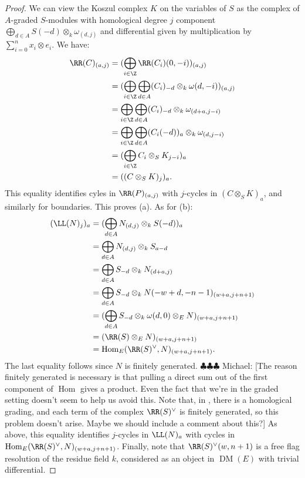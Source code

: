 \documentclass[12pt]{amsart}
\theoremstyle{definition}
\theoremstyle{remark}
\newcommand{\Hom}{\operatorname{Hom}} %
\newcommand{\michael}[1]{{\color{red} \sf $\clubsuit\clubsuit\clubsuit$ Michael: [#1]}}
\def\DM{\operatorname{DM}}
\def\o{\omega}
\begin{document}
\begin{proof}
We can view the Koszul complex $K$ on the variables of $S$ as the complex of $A$-graded $S$-modules with homological degree $j$ component $\bigoplus_{d \in A} S(-d) \otimes_k \o_{(d, j)}$ and differential  given by multiplication by $\sum_{i = 0}^n x_i \otimes e_i$. We have:
\begin{align*}
\RR(C)_{(a, j)} &= (\bigoplus_{ i \in \Z} \RR(C_i)(0,-i))_{(a, j)} \\
& = (\bigoplus_{i \in \Z} \bigoplus_{d \in A} (C_i)_{-d} \otimes_k \o(d, -i))_{(a, j)} \\ 
& = \bigoplus_{i \in \Z} \bigoplus_{d \in A} (C_i)_{-d} \otimes_k \o_{(d+a, j - i)} \\
& = \bigoplus_{i \in \Z} \bigoplus_{d \in A} (C_i(-d))_a \otimes_k \o_{(d, j - i)}  \\
& = (\bigoplus_{ i \in \Z} C_i \otimes_S K_{j - i})_a \\
& = ((C \otimes_S K)_{j})_a.
\end{align*}
This equality identifies cyles in $\RR(P)_{(a, j)}$ with $j$-cycles in $(C \otimes_S K)_a$, and similarly for boundaries. This proves (a). As for (b): 
\begin{align*}
(\LL(N)_j)_a &= (\bigoplus_{d \in A} N_{(d, j)} \otimes_k S(-d))_a\\
& = \bigoplus_{d \in A} N_{(d, j)} \otimes_k S_{a-d} \\
& = \bigoplus_{d \in A} S_{-d} \otimes_k N_{(d + a, j)} \\
& =  \bigoplus_{d \in A} S_{-d} \otimes_k N(-w + d , -n -1)_{(w + a, j + n + 1)} \\
& =  (\bigoplus_{d \in A} S_{-d} \otimes_k \o(d, 0) \otimes_E N)_{(w + a, j + n + 1)} \\
&= (\RR(S) \otimes_E N)_{(w + a, j + n + 1)} \\
&= \Hom_E(\RR(S)^\vee, N)_{(w + a, j + n + 1)}. 
\end{align*}
The last equality follows since $N$ is finitely generated. \michael{The reason finitely generated is necessary is that pulling a direct sum out of the first component of $\Hom$ gives a product. Even the fact that we're in the graded setting doesn't seem to help us avoid this. Note that, in \cite{EFS}, there is a homological grading, and each term of the complex $\RR(S)^\vee$ is finitely generated, so this problem doesn't arise. Maybe we should include a comment about this?} As above, this equality identifies $j$-cycles in $\LL(N)_a$ with cycles in $\Hom_E(\RR(S)^\vee, N)_{(w + a, j + n + 1)}$. Finally, note that $\RR(S)^\vee(w, n+1)$ is a free flag resolution of the residue field $k$, considered as an object in $\DM(E)$ with trivial differential.
\end{proof}
\end{document}
